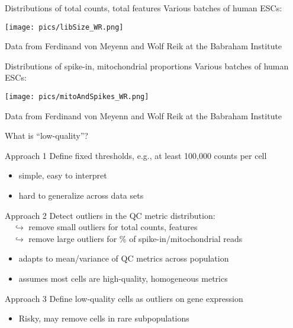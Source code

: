\documentclass{beamer}
\begin{document}
\begin{frame}{Distributions of total counts, total features}
    Various batches of human ESCs:
    \begin{center}
        \texttt{[image: pics/libSize\_WR.png]}
    \end{center}
    {\tiny Data from Ferdinand von Meyenn and Wolf Reik at the Babraham Institute}
\end{frame}
    
\begin{frame}{Distributions of spike-in, mitochondrial proportions}
    Various batches of human ESCs:
    \begin{center}
        \texttt{[image: pics/mitoAndSpikes\_WR.png]}
    \end{center}
    {\tiny Data from Ferdinand von Meyenn and Wolf Reik at the Babraham Institute}
\end{frame}

\begin{frame}{What is ``low-quality''?}
    \begin{exampleblock}{Approach 1}
        Define fixed thresholds, e.g., at least 100,000 counts per cell
        \begin{itemize}
            \item simple, easy to interpret
            \item hard to generalize across data sets 
        \end{itemize}
    \end{exampleblock}
    \pause
    \begin{exampleblock}{Approach 2}
        Detect outliers in the QC metric distribution:\\
        $\quad\hookrightarrow$ remove small outliers for total counts, features \\
        $\quad\hookrightarrow$ remove large outliers for \% of spike-in/mitochondrial reads
        \begin{itemize}
            \item adapts to mean/variance of QC metrics across population
            \item assumes most cells are high-quality, homogeneous metrics
        \end{itemize}
    \end{exampleblock}
    \pause
    \begin{alertblock}{Approach 3}
        Define low-quality cells as outliers on gene expression
        \begin{itemize}
            \item Risky, may remove cells in rare subpopulations
        \end{itemize}
    \end{alertblock}
\end{frame}
\end{document}
